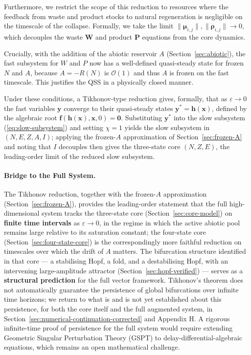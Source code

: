 \documentclass[twocolumn,10pt]{article}
\begin{document}
Furthermore, we restrict the scope of this reduction to resources where the feedback from waste and product stocks to natural regeneration is negligible on the timescale of the collapse. Formally, we take the limit \(\|\boldsymbol{\mu}_{i,j}\|, \|\boldsymbol{\rho}_{i,j}\| \to 0\), which decouples the waste \(\mathbf{W}\) and product \(\mathbf{P}\) equations from the core dynamics.

Crucially, with the addition of the abiotic reservoir \(A\) (Section~\ref{sec:abiotic}), the fast subsystem for \(W\) and \(P\) now has a well-defined quasi-steady state for frozen \(N\) and \(A\), because \(\dot{A} = -R(N)\) is \(\mathcal{O}(1)\) and thus \(A\) is frozen on the fast timescale. This justifies the QSS in a physically closed manner.

Under these conditions, a Tikhonov-type reduction gives, formally, that as \(\varepsilon \to 0\) the fast variables \(\mathbf{y}\) converge to their quasi-steady states \(\mathbf{y}^* = \mathbf{h}(\mathbf{x})\), defined by the algebraic root \(\mathbf{f}(\mathbf{h}(\mathbf{x}), \mathbf{x}, 0) = \mathbf{0}\). Substituting \(\mathbf{y}^*\) into the slow subsystem (\ref{eq:slow-subsystem}) and setting \(\chi=1\) yields the slow subsystem in \((N,E,Z,A,I)\); applying the frozen-\(A\) approximation of Section~\ref{sec:frozen-A} and noting that \(I\) decouples then gives the three-state core \((N,Z,E)\), the leading-order limit of the reduced slow subsystem.

\paragraph{Bridge to the Full System.}
The Tikhonov reduction, together with the frozen-\(A\) approximation (Section~\ref{sec:frozen-A}), provides the leading-order statement that the full high-dimensional system tracks the three-state core (Section~\ref{sec:core-model}) on \textbf{finite time intervals} as \(\varepsilon \to 0\), in the regime in which the active abiotic pool remains large relative to its saturation constant; the four-state core (Section~\ref{sec:four-state-core}) is the correspondingly more faithful reduction on timescales over which the drift of \(A\) matters. The bifurcation structure identified in that core — a stabilising Hopf, a fold, and a destabilising Hopf, with an intervening large-amplitude attractor (Section~\ref{sec:hopf-verified}) — serves as a \textbf{structural prediction} for the full vector framework. Tikhonov's theorem does not automatically guarantee the persistence of global bifurcations over infinite time horizons; we return to what is and is not yet established about this persistence, for both the core itself and the full augmented system, in Section~\ref{sec:numerical-continuation-corrected} and Appendix H. A rigorous infinite-time proof of persistence for the full system would require extending Geometric Singular Perturbation Theory (GSPT) to delay-differential-algebraic equations, which remains an open mathematical challenge.
\end{document}
